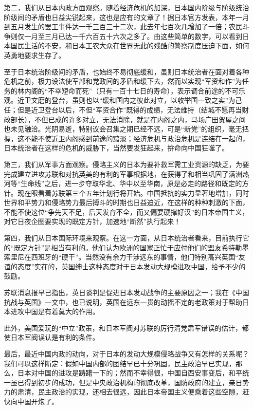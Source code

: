 第二，我们从日本内政方面观察。随着经济危机的加深，日本国内阶级与阶级统治阶级间的矛盾也日益尖锐起来，这也是应有的文章了！据日本官方发表，本年一月到五月发生的罢工事件达一千三百三十二次，此去年七百次几增加了一倍；农民斗争则仅一月至三月已达一千六百五十六次之多了。由这些简单的数字，可以看到日本国民生活的不安，和日本工农大众在世界无此的残酷的警察制度压迫下面，如何英勇地要求生存了。

至于日本统治阶级间的矛盾，也始终不易彻底缓和，虽则日本统治者在面对着各种危机之前，极力设法使军部和党政间的矛盾和缓下去，然而以实现“军资和作”为任务的林内阁的“不幸短命而死”（只有一百十七日的寿命），表示调合前途的不可乐观。近卫文磨的登台，虽则也以“缓和国内之彼此对立，以收举国一致之实”为己任；但是近卫登台以后，不但“军资合作”既得的成绩，无法维持（结城不愿再当财政部长），不但已成的许多对立，无法消除，就是在内阁之内，马场广田贺屋之间也未见融洽。光阴易逝，特别议会召集之期已经不远，可是“新党”的组织，毫无把握，这不能不使近卫内阁感到前途的黯淡；经济危机与政治危机是连结在一起的，日本统治者在这样的危机的威胁下，当然要发狂起来，拚命向中国狂噬了。

第三，我们从军事方面观察。侵略主义的日本为要补救军需工业资源的缺乏，为要完成建立进攻苏联和对抗英美的有利的军事根据地，在获得了和相当巩固了满洲热河等“生命线”之后，进一步夺取华北、华中以至华南，原是必走的路径和既定的方针。现在眼看着苏联第三个五年计划行将开始。中国抵抗的实力显著地增加，同时世界和平势力和侵略势力最后搏斗的时期也日益迫近，在这样的种种刺激的下面，不能不使这位“争先天不足，后天发育不全，而又偏要硬撑好汉”的日本帝国主义，对它日夜企图要实现的既定方针，加速地“断然”执行起来！

第四，我们从日本国际环境来观察。在这一方面，从日本统治者看来，目前执行它的“既定方针”是相当有利的。他们认为欧洲的国家正忙于应付他们的盟友希特勒墨索里尼在西班牙的“硬干”。当然没有余力干涉远东的事情，他们特别高兴英国“友谊的态度”实在的，英国绅士这种态度对于日本发动大规模进攻中国，给予不少的鼓励。

苏联消息报早已指出，英日谈判是促进日本发动战争的主要原因之一；我在《中国抗战与英国》一文中，也已说明，英国在远东一贯的动摇不定的老政策对于帮助日本进攻中国是有着莫大的作用。

此外，美国爱玩的“中立”政策，和日本军阀对苏联的厉行清党肃军错误的估计，都使日本军阀误认是有利的条件。

最后，最近中国内政的动向，对于日本的发动大规模侵略战争又有怎样的关系呢？我们可以这样断定：假如中国内部的团结早已十分巩固，民主政治早已实现，那么，日本对中国的进攻是踌躇一下的；然而不幸得很，中国自西安事变后，和平统一虽已得到初步的成功，但是中央政治机构的彻底改革，国防政府的建立，亲日势力的肃清，民主政治的实现，还相去很远，因此日本帝国主义便乘着这些空隙，赶快向中国开炮了。

